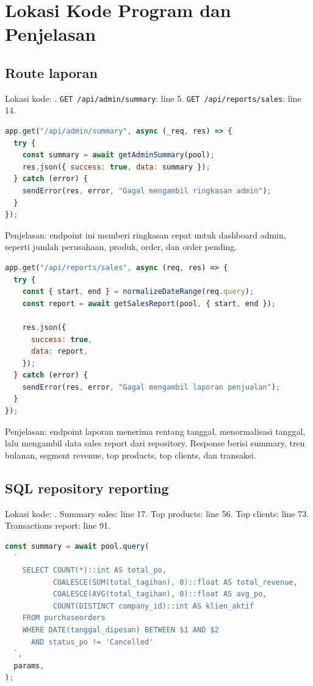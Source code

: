 \documentclass[11pt,a4paper]{article}
\begin{document}
\section*{Lokasi Kode Program dan Penjelasan}
\subsection*{Route laporan}
Lokasi kode: . \texttt{GET /api/admin/summary}: line 5. \texttt{GET /api/reports/sales}: line 14.

\begin{lstlisting}[language=JavaScript]
app.get("/api/admin/summary", async (_req, res) => {
  try {
    const summary = await getAdminSummary(pool);
    res.json({ success: true, data: summary });
  } catch (error) {
    sendError(res, error, "Gagal mengambil ringkasan admin");
  }
});
\end{lstlisting}

Penjelasan: endpoint ini memberi ringkasan cepat untuk dashboard admin, seperti jumlah perusahaan, produk, order, dan order pending.

\begin{lstlisting}[language=JavaScript]
app.get("/api/reports/sales", async (req, res) => {
  try {
    const { start, end } = normalizeDateRange(req.query);
    const report = await getSalesReport(pool, { start, end });

    res.json({
      success: true,
      data: report,
    });
  } catch (error) {
    sendError(res, error, "Gagal mengambil laporan penjualan");
  }
});
\end{lstlisting}

Penjelasan: endpoint laporan menerima rentang tanggal, menormalisasi tanggal, lalu mengambil data sales report dari repository. Response berisi summary, tren bulanan, segment revenue, top products, top clients, dan transaksi.

\subsection*{SQL repository reporting}
Lokasi kode: . Summary sales: line 17. Top products: line 56. Top clients: line 73. Transactions report: line 91.

\begin{lstlisting}[language=JavaScript]
const summary = await pool.query(
  `
    SELECT COUNT(*)::int AS total_po,
           COALESCE(SUM(total_tagihan), 0)::float AS total_revenue,
           COALESCE(AVG(total_tagihan), 0)::float AS avg_po,
           COUNT(DISTINCT company_id)::int AS klien_aktif
    FROM purchaseorders
    WHERE DATE(tanggal_dipesan) BETWEEN $1 AND $2
      AND status_po != 'Cancelled'
  `,
  params,
);
\end{lstlisting}
\end{document}
